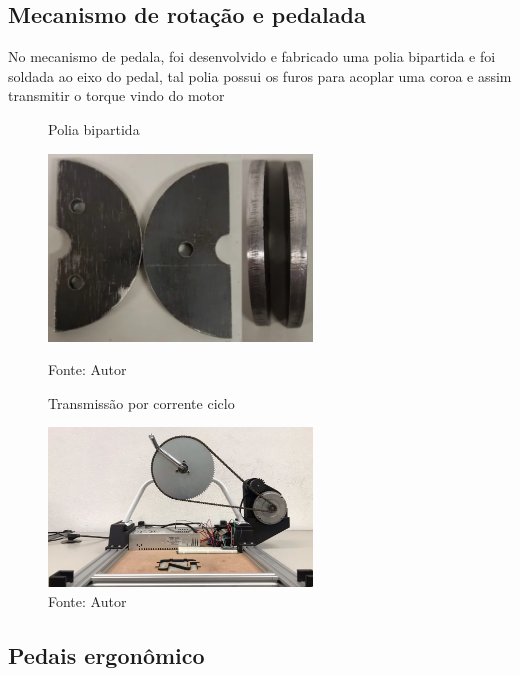 \documentclass[../poliXuniversity_hospital_(USP)_report.tex]{subfiles}
\begin{document}
\subsection{Mecanismo de rotação e pedalada}
No mecanismo de pedala, foi desenvolvido e fabricado uma polia bipartida e foi soldada ao eixo do pedal, tal polia possui os furos para acoplar uma coroa e assim transmitir o torque vindo do motor

\begin{figure}[h]
\centering
    \begin{minipage}{0.5\textwidth}
        \centering
        \caption{Polia bipartida}
        \centering %
        \includegraphics[width=7cm]{images/poliabipartida.png}
        \caption*{Fonte: Autor}
        \label{figura: Polia bipartida}
        
    \end{minipage}\hfill
    \begin{minipage}{0.5\textwidth}
    
        \centering
        \caption{Transmissão por corrente ciclo}
        \centering %
        \includegraphics[width=7cm]{images/tração_ciclo.png}
        \caption*{Fonte: Autor}
        \label{figura: Transmissão por corrente ciclo}
        
    \end{minipage}\hfill
\end{figure}

\subsection{Pedais ergonômico}
\end{document}
